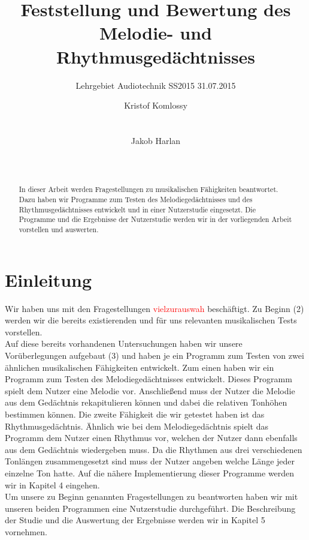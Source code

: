 \documentclass{acm_proc_article-sp}
\begin{document}
\title{Feststellung und Bewertung des Melodie- und Rhythmusgedächtnisses}
\subtitle{Lehrgebiet Audiotechnik SS2015 31.07.2015}

\author{
\alignauthor
Kristof Komlossy\\
       \\
       \\
\alignauthor
Jakob Harlan\\
       \\
       \\
} %

\maketitle

\begin{abstract}
In dieser Arbeit werden Fragestellungen zu musikalischen Fähigkeiten beantwortet. Dazu haben wir Programme zum Testen des Melodiegedächtnisses und des Rhythmusgedächtnisses entwickelt und in einer Nutzerstudie eingesetzt. Die Programme und die Ergebnisse der Nutzerstudie werden wir in der vorliegenden Arbeit vorstellen und auswerten.
\end{abstract}


\section{Einleitung}
Wir haben uns mit den Fragestellungen \textcolor{red}{vielzurauswah} beschäftigt. 
Zu Beginn (2) werden wir die bereits existierenden und für uns relevanten musikalischen Tests vorstellen.\\
Auf diese bereits vorhandenen Untersuchungen haben wir unsere Vorüberlegungen aufgebaut (3) und haben je ein Programm zum Testen von zwei ähnlichen musikalischen Fähigkeiten entwickelt. Zum einen haben wir ein Programm zum Testen des Melodiegedächtnisses entwickelt. Dieses Programm spielt dem Nutzer eine Melodie vor. Anschließend muss der Nutzer die Melodie aus dem Gedächtnis rekapitulieren können und dabei die relativen Tonhöhen bestimmen können.
Die zweite Fähigkeit die wir getestet haben ist das Rhythmusgedächtnis. Ähnlich wie bei dem Melodiegedächtnis spielt das Programm dem Nutzer einen Rhythmus vor, welchen der Nutzer dann ebenfalls aus dem Gedächtnis wiedergeben muss. Da die Rhythmen aus drei verschiedenen Tonlängen zusammengesetzt sind muss der Nutzer angeben welche Länge jeder einzelne Ton hatte. Auf die nähere Implementierung dieser Programme werden wir in Kapitel 4 eingehen.\\
Um unsere zu Beginn genannten Fragestellungen zu beantworten haben wir mit unseren beiden Programmen eine Nutzerstudie durchgeführt. Die Beschreibung der Studie und die Auswertung der Ergebnisse werden wir in Kapitel 5 vornehmen.
\end{document}
